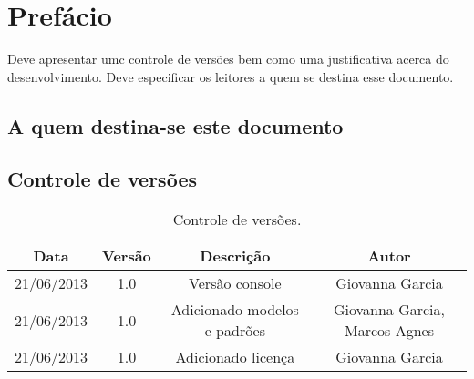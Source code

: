 \chapter{Pref\'acio}

Deve apresentar umc controle de vers\~oes bem como uma justificativa acerca do desenvolvimento. Deve especificar os leitores a quem se destina esse documento.


\section{A quem destina-se este documento}
	


\section{Controle de vers\~oes}

\begin{table}[!htb]
	\centering	
	\label{tab:contVersao}
	\begin{tabular}{cccc}
		\hline 
		Data & Vers\~ao & Descriç\~ao & Autor \\
		\hline
		21/06/2013 & 1.0 & Versão console & Giovanna Garcia \\
		\hline
		21/06/2013 & 1.0 & Adicionado modelos e padrões & Giovanna Garcia, Marcos Agnes\\
		\hline
		21/06/2013 & 1.0 & Adicionado licença & Giovanna Garcia\\
		\hline 
	\end{tabular}
	\caption[Controle de vers\~oes]{Controle de vers\~oes.}
\end{table}